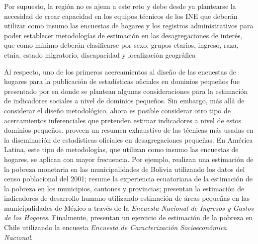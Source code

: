 \documentclass[12pt,spanish,]{book}
\begin{document}
Por supuesto, la región no es ajena a este reto y debe desde ya plantearse la necesidad de crear capacidad en los equipos técnicos de los INE que deberán utilizar como insumo las encuestas de hogares y los registros administrativos para poder establecer metodologías de estimación en las desagregaciones de interés, que como mínimo deberán clasificarse por sexo, grupos etarios, ingreso, raza, etnia, estado migratorio, discapacidad y localización geográfica \autocite{United_Nations_2016}

Al respecto, uno de los primeros acercamientos al diseño de las encuestas de hogares para la publicación de estadísticas oficiales en dominios pequeños fue presentado por \textcite{Sinngh_Gambino_Mantel_1994} en donde se plantean algunas consideraciones para la estimación de indicadores sociales a nivel de dominios pequeños. Sin embargo, más allá de considerar el diseño metodológico, ahora es posible considerar otro tipo de acercamientos inferenciales que pretenden estimar indicadores a nivel de estos dominios pequeños. \textcite{Rao_Molina_2014} proveen un resumen exhaustivo de las técnicas más usadas en la diseminación de estadísticas oficiales en desagregaciones pequeñas. En América Latina, este tipo de metodologías, que utilizan como insumo las encuestas de hogares, se aplican con mayor frecuencia. Por ejemplo, \textcite{arias2007geography} realizan una estimación de la pobreza monetaria en las municipalidades de Bolivia utilizando los datos del censo poblacional del 2001; \textcite{araujo20071990} resume la experiencia ecuatoriana de la estimación de la pobreza en los municipios, cantones y provincias; \textcite{lopez2007poverty} presentan la estimación de indicadores de desarrollo humano utilizando estimación de áreas pequeñas en las municipalidades de México a través de la \emph{Encuesta Nacional de Ingresos y Gastos de los Hogares}. Finalmente, \textcite{Casas_Cordero_Valencia_Encina_Lahiri_2016} presentan un ejercicio de estimación de la pobreza en Chile utilizando la encuesta \emph{Encuesta de Caracterización Socioeconómica Nacional}.
\end{document}
